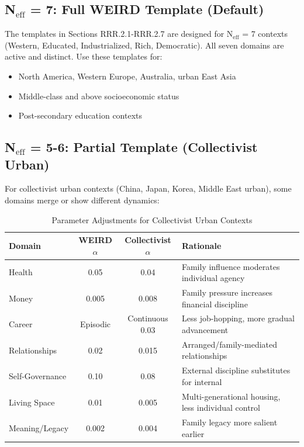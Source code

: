 \subsection{N$_{\text{eff}}$ = 7: Full WEIRD Template (Default)}

The templates in Sections RRR.2.1-RRR.2.7 are designed for N$_{\text{eff}}$ = 7 contexts
(Western, Educated, Industrialized, Rich, Democratic). All seven domains are active and
distinct. Use these templates for:
\begin{itemize}[nosep]
\item North America, Western Europe, Australia, urban East Asia
\item Middle-class and above socioeconomic status
\item Post-secondary education contexts
\end{itemize}

\subsection{N$_{\text{eff}}$ = 5-6: Partial Template (Collectivist Urban)}

For collectivist urban contexts (China, Japan, Korea, Middle East urban), some domains
merge or show different dynamics:

\begin{table}[htbp]
\centering
\caption{Parameter Adjustments for Collectivist Urban Contexts}
\label{tab:rrr-collectivist}
\renewcommand{\arraystretch}{1.3}
\small
\begin{tabular}{@{}lccl@{}}
\toprule
\textbf{Domain} & \textbf{WEIRD $\alpha$} & \textbf{Collectivist $\alpha$} & \textbf{Rationale} \\
\midrule
Health & 0.05 & 0.04 & Family influence moderates individual agency \\
Money & 0.005 & 0.008 & Family pressure increases financial discipline \\
Career & Episodic & Continuous 0.03 & Less job-hopping, more gradual advancement \\
Relationships & 0.02 & 0.015 & Arranged/family-mediated relationships \\
Self-Governance & 0.10 & 0.08 & External discipline substitutes for internal \\
Living Space & 0.01 & 0.005 & Multi-generational housing, less individual control \\
Meaning/Legacy & 0.002 & 0.004 & Family legacy more salient earlier \\
\bottomrule
\end{tabular}
\end{table}


